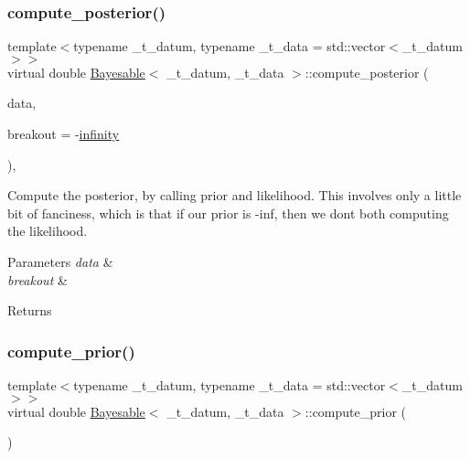 \subsubsection{\texorpdfstring{compute\+\_\+posterior()}{compute\_posterior()}}
{\footnotesize\ttfamily template$<$typename \+\_\+t\+\_\+datum, typename \+\_\+t\+\_\+data = std\+::vector$<$\+\_\+t\+\_\+datum$>$$>$ \\
virtual double \hyperlink{class_bayesable}{Bayesable}$<$ \+\_\+t\+\_\+datum, \+\_\+t\+\_\+data $>$\+::compute\+\_\+posterior (\begin{DoxyParamCaption}\item[{const \hyperlink{class_bayesable_a70a593a67c7d43239ecc06bb4fd06a6b}{t\+\_\+data} \&}]{data,  }\item[{const double}]{breakout = {\ttfamily -\/\hyperlink{_numerics_8h_a1bb1e42ae1b40cad6e99da0aab8a5576}{infinity}} }\end{DoxyParamCaption})\hspace{0.3cm}{\ttfamily [inline]}, {\ttfamily [virtual]}}

Compute the posterior, by calling prior and likelihood. This involves only a little bit of fanciness, which is that if our prior is -\/inf, then we don\textquotesingle{}t both computing the likelihood. 
\begin{DoxyParams}{Parameters}
{\em data} & \\
\hline
{\em breakout} & \\
\hline
\end{DoxyParams}
\begin{DoxyReturn}{Returns}

\end{DoxyReturn}
\mbox{\label{class_bayesable_a9aa752f0adff1b95f8957b91fc928649}} 
\subsubsection{\texorpdfstring{compute\+\_\+prior()}{compute\_prior()}}
{\footnotesize\ttfamily template$<$typename \+\_\+t\+\_\+datum, typename \+\_\+t\+\_\+data = std\+::vector$<$\+\_\+t\+\_\+datum$>$$>$ \\
virtual double \hyperlink{class_bayesable}{Bayesable}$<$ \+\_\+t\+\_\+datum, \+\_\+t\+\_\+data $>$\+::compute\+\_\+prior (\begin{DoxyParamCaption}{ }\end{DoxyParamCaption})\hspace{0.3cm}{\ttfamily [pure virtual]}}



